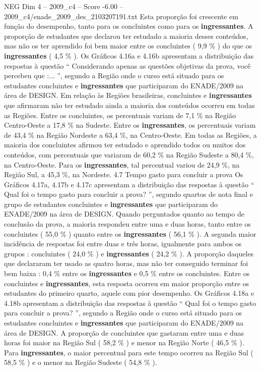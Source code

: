 \begin{textsample}{NEG Dim 4 – 2009\_c4 – Score -6.00 – 2009\_c4/enade\_2009\_des\_2103207191.txt}
Esta proporção foi crescente em função do desempenho, tanto para os concluintes como para os \textbf{ingressantes}.
A proporção de estudantes que declarou ter estudado a maioria desses conteúdos, mas não os ter aprendido foi bem maior entre os concluintes ( 9,9 \% ) do que os \textbf{ingressantes} ( 4,5 \% ).
Os Gráficos 4.16a e 4.16b apresentam a distribuição das respostas à questão “ Considerando apenas as questões objetivas da prova, você percebeu que :... ”, segundo a Região onde o curso está situado para os estudantes concluintes e \textbf{ingressantes} que participaram do ENADE/2009 na área de DESIGN.
Em relação às Regiões brasileiras, concluintes e \textbf{ingressantes} que afirmaram não ter estudado ainda a maioria dos conteúdos ocorreu em todas as Regiões.
Entre os concluintes, os percentuais variam de 7,1 \% na Região Centro-Oeste a 17,8 \% na Sudeste.
Entre os \textbf{ingressantes}, os percentuais variam de 43,4 \% na Região Nordeste a 63,4 \%, na Centro-Oeste.
Em todas as Regiões, a maioria dos concluintes afirmou ter estudado e aprendido todos ou muitos dos conteúdos, com percentuais que variaram de 60,2 \% na Região Sudeste a 80,4 \%, na Centro-Oeste.
Para os \textbf{ingressantes}, tal percentual variou de 24,9 \%, na Região Sul, a 45,3 \%, na Nordeste. 4.7 Tempo gasto para concluir a prova Os Gráficos 4.17a, 4.17b e 4.17c apresentam a distribuição das respostas à questão “ Qual foi o tempo gasto para concluir a prova? ”, segundo quartos de nota final e grupo de estudantes concluintes e \textbf{ingressantes} que participaram do ENADE/2009 na área de DESIGN.
Quando perguntados quanto ao tempo de conclusão da prova, a maioria respondeu entre uma e duas horas, tanto entre os concluintes ( 55,0 \% ) quanto entre os \textbf{ingressantes} ( 56,1 \% ).
A segunda maior incidência de respostas foi entre duas e três horas, igualmente para ambos os grupos : concluintes ( 24,0 \% ) e \textbf{ingressantes} ( 24,2 \% ).
A proporção daqueles que declararam ter usado as quatro horas, mas não ter conseguido terminar foi bem baixa : 0,4 \% entre os \textbf{ingressantes} e 0,5 \% entre os concluintes.
Entre os concluintes e \textbf{ingressantes}, esta resposta ocorreu em maior proporção entre os estudantes do primeiro quarto, aquele com pior desempenho.
Os Gráficos 4.18a e 4.18b apresentam a distribuição das respostas à questão “ Qual foi o tempo gasto para concluir a prova? ”, segundo a Região onde o curso está situado para os estudantes concluintes e \textbf{ingressantes} que participaram do ENADE/2009 na área de DESIGN.
A proporção de concluintes que gastaram entre uma e duas horas foi maior na Região Sul ( 58,2 \% ) e menor na Região Norte ( 46,5 \% ).
Para \textbf{ingressantes}, o maior percentual para este tempo ocorreu na Região Sul ( 58,5 \% ) e o menor na Região Sudeste ( 54,8 \% ).

\end{textsample}
